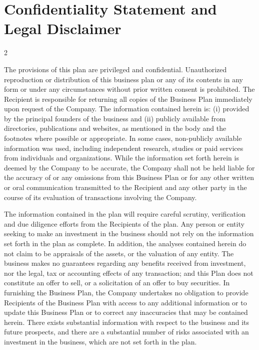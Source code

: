 \documentclass[9pt,]{book}
\begin{document}
\pagestyle{fancy}
\section*{Confidentiality Statement and Legal Disclaimer}

\begin {multicols}{2}

The provisions of this plan are privileged and confidential.
Unauthorized reproduction or distribution of this business plan or any
of its contents in any form or under any circumstances without prior
written consent is prohibited. The Recipient is responsible for
returning all copies of the Business Plan immediately upon request of
the Company. The information contained herein is: (i) provided by the
principal founders of the business and (ii) publicly available from
directories, publications and websites, as mentioned in the body and the
footnotes where possible or appropriate. In some cases, non-publicly
available information was used, including independent research, studies
or paid services from individuals and organizations. While the
information set forth herein is deemed by the Company to be accurate,
the Company shall not be held liable for the accuracy of or any
omissions from this Business Plan or for any other written or oral
communication transmitted to the Recipient and any other party in the
course of its evaluation of transactions involving the Company.

The information contained in the plan will require careful scrutiny,
verification and due diligence efforts from the Recipients of the plan.
Any person or entity seeking to make an investment in the business
should not rely on the information set forth in the plan as complete. In
addition, the analyses contained herein do not claim to be appraisals of
the assets, or the valuation of any entity. The business makes no
guarantees regarding any benefits received from investment, nor the
legal, tax or accounting effects of any transaction; and this Plan does
not constitute an offer to sell, or a solicitation of an offer to buy
securities. In furnishing the Business Plan, the Company undertakes no
obligation to provide Recipients of the Business Plan with access to any
additional information or to update this Business Plan or to correct any
inaccuracies that may be contained herein. There exists substantial
information with respect to the business and its future prospects, and
there are a substantial number of risks associated with an investment in
the business, which are not set forth in the plan.


\end{multicols}
\end{document}
